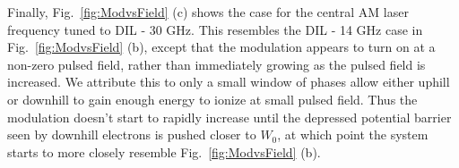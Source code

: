 \documentclass[aps,pra,preprint,groupedaddress]{revtex4-1}
\begin{document}
Finally, Fig.~\ref{fig:ModvsField} (c) shows the case for the central AM laser frequency tuned to DIL - 30 GHz. This resembles the DIL - 14 GHz case in Fig.~\ref{fig:ModvsField} (b), except that the modulation appears to turn on at a non-zero pulsed field, rather than immediately growing as the pulsed field is increased. We attribute this to only a small window of phases allow either uphill or downhill to gain enough energy to ionize at small pulsed field. Thus the modulation doesn't start to rapidly increase until the depressed potential barrier seen by downhill electrons is pushed closer to $W_0$, at which point the system starts to more closely resemble Fig.~\ref{fig:ModvsField} (b).

%
%
%
\end{document}
